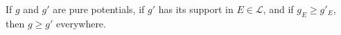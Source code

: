 If $g$ and $g'$ are pure potentials, if $g'$ has its support in $E \in \mathcal{L}$, and if $g_E \geq g'_E$, then $g \geq g'$ everywhere.
